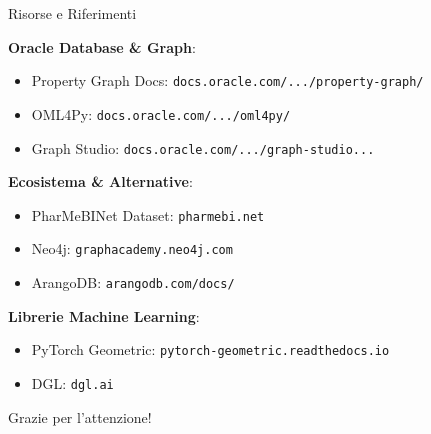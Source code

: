 \documentclass[aspectratio=169]{beamer}
\begin{document}
\begin{frame}{Risorse e Riferimenti}
    \footnotesize
    \setlength{\itemsep}{2pt}
    \setlength{\parskip}{0pt}
    
    \textbf{\faBook \hspace{0.2cm} Oracle Database \& Graph}:
    \begin{itemize}
        \setlength{\itemsep}{1pt}
        \item Property Graph Docs: \texttt{docs.oracle.com/.../property-graph/}
        \item OML4Py: \texttt{docs.oracle.com/.../oml4py/}
        \item Graph Studio: \texttt{docs.oracle.com/.../graph-studio...}
    \end{itemize}
    
    \textbf{\faDatabase \hspace{0.2cm} Ecosistema \& Alternative}:
    \begin{itemize}
        \setlength{\itemsep}{1pt}
        \item PharMeBINet Dataset: \texttt{pharmebi.net}
        \item Neo4j: \texttt{graphacademy.neo4j.com}
        \item ArangoDB: \texttt{arangodb.com/docs/}
    \end{itemize}
    
    \textbf{\faPython \hspace{0.2cm} Librerie Machine Learning}:
    \begin{itemize}
        \setlength{\itemsep}{1pt}
        \item PyTorch Geometric: \texttt{pytorch-geometric.readthedocs.io}
        \item DGL: \texttt{dgl.ai}
    \end{itemize}
\end{frame}

{
\begin{frame}[standout]
    \Huge Grazie per l'attenzione!
\end{frame}
}
\end{document}
